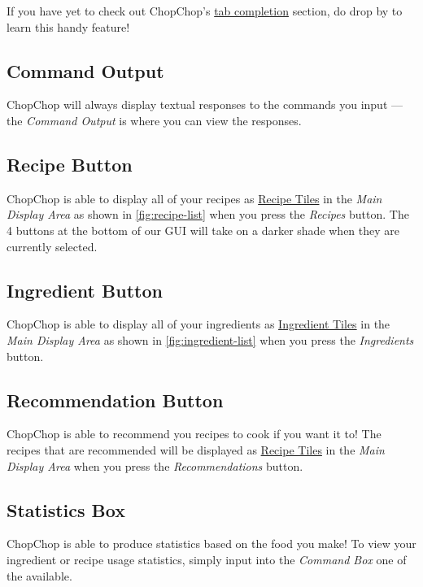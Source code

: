 	If you have yet to check out ChopChop's \hyperlink{TabCompletion}{tab completion} section, do drop by to learn this handy feature!


\hypertarget{CommandOutput}{}
\subsection{Command Output}
	ChopChop will always display textual responses to the commands you input — the \emph{Command Output} is where you can view
	the responses.


\hypertarget{RecipeButton}{}
\subsection{Recipe Button}
	ChopChop is able to display all of your recipes as \hyperlink{RecipeTiles}{Recipe Tiles} in the \emph{Main Display Area} as shown in
	\autoref{fig:recipe-list} when you press the \emph{Recipes} button. The 4 buttons at the bottom of our GUI will take on a darker
	shade when they are currently selected.


\hypertarget{IngredientButton}{}
\subsection{Ingredient Button}
	ChopChop is able to display all of your ingredients as \hyperlink{IngredientTiles}{Ingredient Tiles} in the \emph{Main Display Area} as
	shown in \autoref{fig:ingredient-list} when you press the \emph{Ingredients} button.


\hypertarget{RecommendationButton}{}
\subsection{Recommendation Button}
	ChopChop is able to recommend you recipes to cook if you want it to! The recipes that are recommended will be displayed as
	\hyperlink{RecipeTiles}{Recipe Tiles} in the \emph{Main Display Area} when you press the \emph{Recommendations} button.


\hypertarget{StatisticsBox}{}
\subsection{Statistics Box}
	ChopChop is able to produce statistics based on the food you make! To view your ingredient or recipe usage statistics, simply
	input into the \emph{Command Box} one of the \hyperlink{GroupStatsCommands}{} available.


